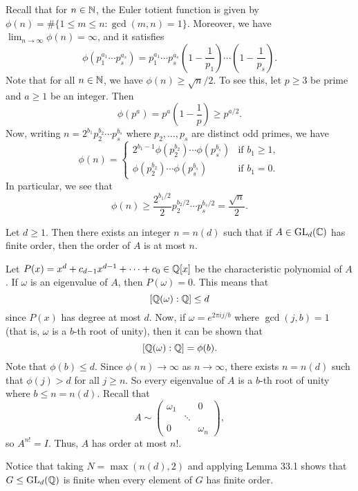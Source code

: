 Recall that for $n \in \mathbb{N}$, the Euler totient function is given by 
$\phi(n) = \#\{1 \leq m \leq n : \gcd(m, n) = 1\}$. Moreover, 
we have $\lim_{n\to\infty} \phi(n) = \infty$, and it satisfies 
\[ \phi(p_1^{a_1} \cdots p_s^{a_s}) = p_1^{a_1} \cdots p_s^{a_s} 
\left(1 - \frac1{p_1}\right) \cdots \left(1 - \frac1{p_s}\right). \] 
Note that for all $n \in \mathbb{N}$, we have $\phi(n) \geq \sqrt{n}/2$. 
To see this, let $p \geq 3$ be prime and $a \geq 1$ be an integer. 
Then 
\[ \phi(p^a) = p^a\left(1 - \frac{1}{p}\right) \geq p^{a/2}. \] 
Now, writing $n = 2^{b_1}p_2^{b_2} \cdots p_s^{b_s}$ where $p_2, \dots, p_s$ 
are distinct odd primes, we have 
\[ \phi(n) = \begin{cases}
    2^{b_1-1}\phi(p_2^{b_2}) \cdots \phi(p_s^{b_s}) & \text{if } b_1 \geq 1, \\ 
    \phi(p_2^{b_2}) \cdots \phi(p_s^{b_s}) & \text{if } b_1 = 0. 
\end{cases} \] 
In particular, we see that 
\[ \phi(n) \geq \frac{2^{b_1/2}}2 p_2^{b_2/2} \cdots p_s^{b_s/2} = \frac{\sqrt n}2. \] 
\begin{lemma}{}
    Let $d \geq 1$. Then there exists an integer $n = n(d)$ such that if 
    $A \in \operatorname{GL}_d(\mathbb{C})$ has finite order, then the order of $A$ is at most $n$. 
\end{lemma}
\begin{pf}
    Let $P(x) = x^d + c_{d-1}x^{d-1} + \cdots + c_0 \in \mathbb{Q}[x]$ be the characteristic 
    polynomial of $A$. If $\omega$ is an eigenvalue of $A$, then $P(\omega) = 0$. This 
    means that 
    \[ [\mathbb{Q}(\omega) : \mathbb{Q}] \leq d \] 
    since $P(x)$ has degree at most $d$. Now, if $\omega = e^{2\pi ij/b}$ 
    where $\gcd(j, b) = 1$ (that is, $\omega$ is a $b$-th root of unity), then 
    it can be shown that 
    \[ [\mathbb{Q}(\omega) : \mathbb{Q}] = \phi(b). \] 
    Note that $\phi(b) \leq d$. Since $\phi(n) \to \infty$ as $n \to \infty$, 
    there exists $n = n(d)$ such that $\phi(j) > d$ for all $j \geq n$. 
    So every eigenvalue of $A$ is a $b$-th root of unity where $b \leq 
    n = n(d)$. Recall that 
    \[ A \sim \begin{pmatrix}
        \omega_1 & & 0 \\ 
        & \ddots & \\ 
        0 & & \omega_n
    \end{pmatrix}, \] 
    so $A^{n!} = I$. Thus, $A$ has order at most $n!$. 
\end{pf}

Notice that taking $N = \max(n(d), 2)$ and applying Lemma 33.1 shows that 
$G \leq \operatorname{GL}_d(\mathbb{Q})$ is finite when every element of $G$ has finite order.  
